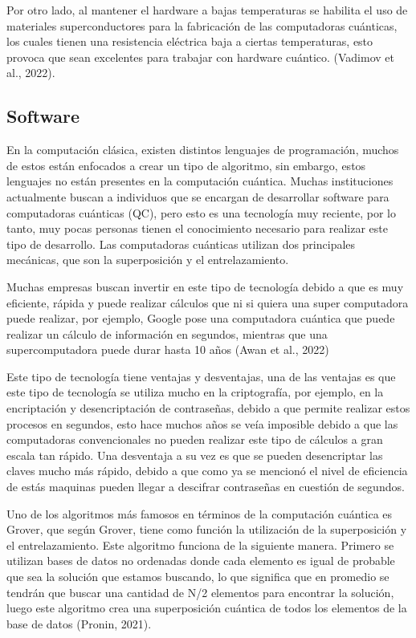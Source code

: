 \documentclass[twoside]{article}
\begin{document}
Por otro lado, al mantener el hardware a bajas temperaturas se habilita el uso de materiales superconductores para la fabricación de las computadoras cuánticas, los cuales tienen una resistencia eléctrica baja a ciertas temperaturas, esto provoca que sean excelentes para trabajar con hardware cuántico. (Vadimov et al., 2022).


\subsection{Software}
En la computación clásica, existen distintos lenguajes de programación, muchos de estos están enfocados a crear un tipo de algoritmo, sin embargo, estos lenguajes no están presentes en la computación cuántica. Muchas instituciones actualmente buscan a individuos que se encargan de desarrollar software para computadoras cuánticas (QC), pero esto es una tecnología muy reciente, por lo tanto, muy pocas personas tienen el conocimiento necesario para realizar este tipo de desarrollo. Las computadoras cuánticas utilizan dos principales mecánicas, que son la superposición y el entrelazamiento. 

Muchas empresas buscan invertir en este tipo de tecnología debido a que es muy eficiente, rápida y puede realizar cálculos que ni si quiera una super computadora puede realizar, por ejemplo, Google pose una computadora cuántica que puede realizar un cálculo de información en segundos, mientras que una supercomputadora puede durar hasta 10 años (Awan et al., 2022)

Este tipo de tecnología tiene ventajas y desventajas, una de las ventajas es que este tipo de tecnología se utiliza mucho en la criptografía, por ejemplo, en la encriptación y desencriptación de contraseñas, debido a que permite realizar estos procesos en segundos, esto hace muchos años se veía imposible debido a que las computadoras convencionales no pueden realizar este tipo de cálculos a gran escala tan rápido. Una desventaja a su vez es que se pueden desencriptar las claves mucho más rápido, debido a que como ya se mencionó el nivel de eficiencia de estás maquinas pueden llegar a descifrar contraseñas en cuestión de segundos. 

Uno de los algoritmos más famosos en términos de la computación cuántica es Grover, que según Grover, tiene como función la utilización de la superposición y el entrelazamiento. Este algoritmo funciona de la siguiente manera. Primero se utilizan bases de datos no ordenadas donde cada elemento es igual de probable que sea la solución que estamos buscando, lo que significa que en promedio se tendrán que buscar una cantidad de N/2 elementos para encontrar la solución, luego este algoritmo crea una superposición cuántica de todos los elementos de la base de datos (Pronin, 2021).
\end{document}
